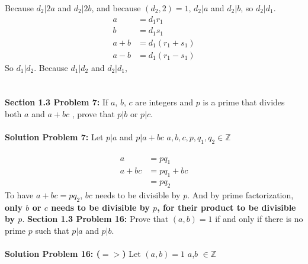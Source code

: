 \documentclass[12pt]{article}
\begin{document}
Because $d_2 | 2a$ and $d_2 | 2b$, and because $(d_2, 2) = 1$, $d_2|a$ and $d_2|b$, so $d_2|d_1$.  
	\begin{align}
		a &= d_1 r_1 \\
		b &= d_1 s_1 \\
		a + b &= d_1(r_1 + s_1) \\
		a - b &= d_1(r_1 - s_1) 
	\end{align} 
So $d_1 | d_2$.  Because $d_1 | d_2$ and $d_2|d_1$, 
\\\\\\
\noindent \textbf{Section 1.3 Problem 7: } If $a$, $b$, $c$ are integers and $p$ is a prime that divides both $a$ and $a + bc$ , prove that $p|b$ or $p|c$. 
\\\\
\noindent \textbf{Solution Problem 7: } Let $p|a$ and $p|a+bc$ \qquad $a,b,c,p,q_1,q_2 \in \mathbb{Z}$ 
\\\\
	\begin{align}
		a &= pq_1 \\
		a + bc &= pq_1 + bc \\
		&= pq_2
	\end{align}
To have $a+bc = pq_2$, $bc$ needs to be divisible by $p$.  And by prime factorization, \textbf{ \boldmath only $b$ or $c$ needs to be divisible by $p$, for their product to be divisible by $p$}.
\newpage
\noindent \textbf{Section 1.3 Problem 16: } Prove that $(a, b) = 1$ if and only if there is no prime $p$ such that $p|a$ and $p|b$.
\\\\
\noindent \textbf{Solution Problem 16: ($=>$)} Let $(a, b) = 1$ \qquad $a$,$b$ $\in \mathbb{Z}$
\end{document}

